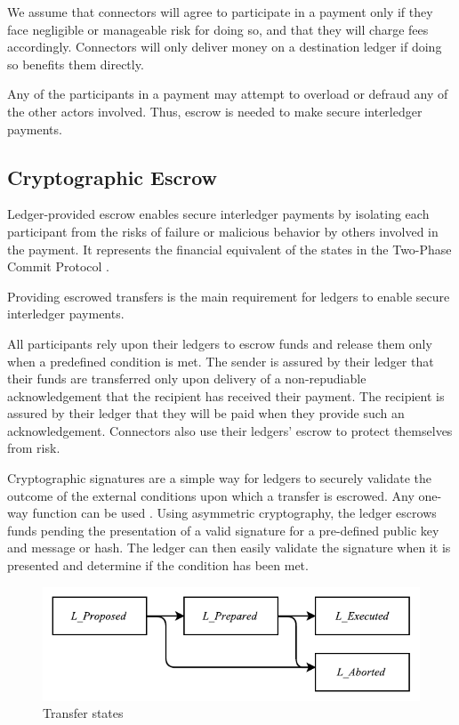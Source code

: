 \documentclass[letterpaper,twocolumn,10pt]{article}
\begin{document}
We assume that connectors will agree to participate in a payment only if they face negligible or manageable risk for doing so, and that they will charge fees accordingly. Connectors will only deliver money on a destination ledger if doing so benefits them directly.

Any of the participants in a payment may attempt to overload or defraud any of the other actors involved. Thus, escrow is needed to make secure interledger payments.


\subsection{Cryptographic Escrow}

Ledger-provided escrow enables secure interledger payments by isolating each participant from the risks of failure or malicious behavior by others involved in the payment. It represents the financial equivalent of the states in the Two-Phase Commit Protocol \cite{Gray:1978:NDB:647433.723863,gray2006consensus}.

Providing escrowed transfers is the main requirement for ledgers to enable secure interledger payments.

All participants rely upon their ledgers to escrow funds and release them only when a predefined condition is met. The sender is assured by their ledger that their funds are transferred only upon delivery of a non-repudiable acknowledgement that the recipient has received their payment. The recipient is assured by their ledger that they will be paid when they provide such an acknowledgement. Connectors also use their ledgers' escrow to protect themselves from risk.

Cryptographic signatures are a simple way for ledgers to securely validate the outcome of the external conditions upon which a transfer is escrowed. Any one-way function can be used \cite{rompel1990one}. Using asymmetric cryptography, the ledger escrows funds pending the presentation of a valid signature for a pre-defined public key and message or hash. The ledger can then easily validate the signature when it is presented and determine if the condition has been met.

\begin{figure}[ht]
    \centering
    \includegraphics[width=\columnwidth]{figures/transfer-states.pdf}
    \caption{Transfer states}
    \label{fig:transfer-states}
\end{figure}
\end{document}
